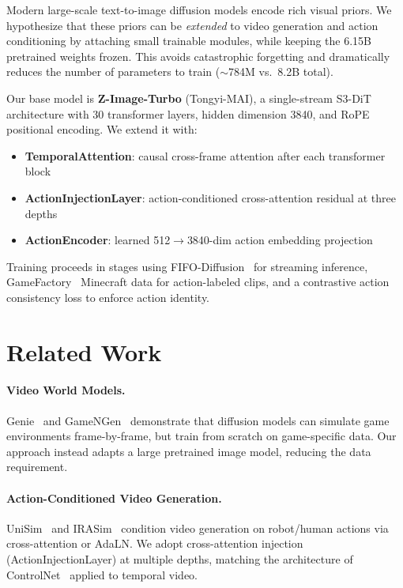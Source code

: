 \documentclass[10pt,twocolumn]{article}
\begin{document}
Modern large-scale text-to-image diffusion models encode rich visual priors. We hypothesize that these priors can be \emph{extended} to video generation and action conditioning by attaching small trainable modules, while keeping the 6.15B pretrained weights frozen. This avoids catastrophic forgetting and dramatically reduces the number of parameters to train ($\sim$784M vs.\ 8.2B total).

Our base model is \textbf{Z-Image-Turbo} (Tongyi-MAI), a single-stream S3-DiT architecture with 30 transformer layers, hidden dimension 3840, and RoPE positional encoding. We extend it with:
\begin{itemize}
  \item \textbf{TemporalAttention}: causal cross-frame attention after each transformer block
  \item \textbf{ActionInjectionLayer}: action-conditioned cross-attention residual at three depths
  \item \textbf{ActionEncoder}: learned 512$\to$3840-dim action embedding projection
\end{itemize}

Training proceeds in stages using FIFO-Diffusion~\cite{kim2024fifo} for streaming inference, GameFactory~\cite{wang2024gamefactory} Minecraft data for action-labeled clips, and a contrastive action consistency loss to enforce action identity.

\section{Related Work}

\paragraph{Video World Models.}
Genie~\cite{bruce2024genie} and GameNGen~\cite{valevski2024gamengen} demonstrate that diffusion models can simulate game environments frame-by-frame, but train from scratch on game-specific data. Our approach instead adapts a large pretrained image model, reducing the data requirement.

\paragraph{Action-Conditioned Video Generation.}
UniSim~\cite{yang2023unisim} and IRASim~\cite{zhu2024irasim} condition video generation on robot/human actions via cross-attention or AdaLN. We adopt cross-attention injection (ActionInjectionLayer) at multiple depths, matching the architecture of ControlNet~\cite{zhang2023controlnet} applied to temporal video.
\end{document}
